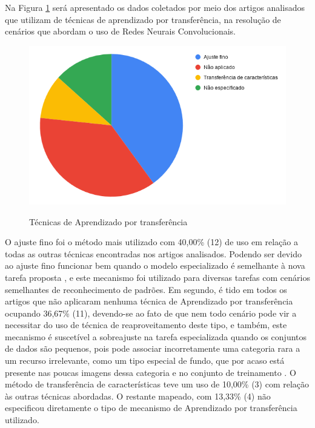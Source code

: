 \documentclass[
	12pt,				%
	oneside,			%
	a4paper,			%
	english,			%
	brazil				%
	]{abntex2ppgsi}
\begin{document}
Na Figura \ref{fig:grafico_transfer-learning_vs_uso} será apresentado os dados coletados por meio dos artigos analisados que utilizam de técnicas de aprendizado por transferência, na resolução de cenários que abordam o uso de Redes Neurais Convolucionais.

\begin{figure}[H]
    \centering
    \caption{Técnicas de Aprendizado por transferência}
    \includegraphics[scale=.60]{imagens/revisao_sistematica/grafico_transfer-learning_vs_uso.png}
    \label{fig:grafico_transfer-learning_vs_uso}
\end{figure}

O ajuste fino foi o método mais utilizado com 40,00\% (12) de uso em relação a todas as outras técnicas encontradas nos artigos analisados. Podendo ser devido ao ajuste fino funcionar bem quando o modelo especializado é semelhante à nova tarefa proposta \cite{valan2019automated}, e este mecanismo foi utilizado para diversas tarefas com cenários semelhantes de reconhecimento de padrões. Em segundo, é tido em todos os artigos que não aplicaram nenhuma técnica de Aprendizado por transferência ocupando 36,67\% (11), devendo-se ao fato de que nem todo cenário pode vir a necessitar do uso de técnica de reaproveitamento deste tipo, e também, este mecanismo é suscetível a sobreajuste na tarefa especializada quando os conjuntos de dados são pequenos, pois pode associar incorretamente uma categoria rara a um recurso irrelevante, como um tipo especial de fundo, que por acaso está presente nas poucas imagens dessa categoria e no conjunto de treinamento \cite{valan2019automated}. O método de transferência de características teve um uso de 10,00\% (3) com relação às outras técnicas abordadas. O restante mapeado, com 13,33\% (4) não especificou diretamente o tipo de mecanismo de Aprendizado por transferência utilizado.
\end{document}
